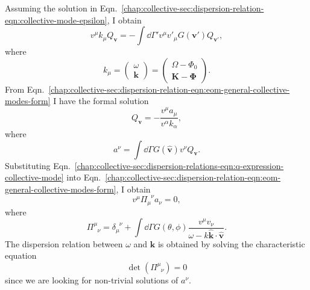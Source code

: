 Assuming the solution in Eqn.~\eqref{chap:collective-sec:dispersion-relation-eqn:collective-mode-epsilon}, I obtain
\begin{equation}
    v^\mu k_\mu Q_{\mathbf v}   =  - \int \dd \Gamma' v^\mu v'_\mu G(\mathbf v')  Q_{\mathbf v'},
    \label{chap:collective-sec:dispersion-relation-eqn:eom-general-collective-modes-form}
\end{equation}
where
\begin{equation}
    k_\mu = \begin{pmatrix}
        \omega \\
        \mathbf k
    \end{pmatrix} = \begin{pmatrix}
        \Omega - \Phi_0 \\
        \mathbf K - \boldsymbol{\Phi}
    \end{pmatrix}.
\end{equation}
From Eqn.~\eqref{chap:collective-sec:dispersion-relation-eqn:eom-general-collective-modes-form} I have the formal solution
\begin{equation}
    Q_{\mathbf v} = - \frac{ v^\mu a_\mu }{ v^\alpha k_\alpha},
    \label{chap:collective-sec:dispersion-relations-eqn:q-expression-collective-mode}
\end{equation}
where
\begin{equation}
    a^\nu = \int \dd \Gamma G(\hat{\mathbf v}) v^\nu Q_{\mathbf v}.
\end{equation}
Substituting Eqn.~\eqref{chap:collective-sec:dispersion-relations-eqn:q-expression-collective-mode} into Eqn.~\eqref{chap:collective-sec:dispersion-relation-eqn:eom-general-collective-modes-form}, I obtain
\begin{equation}
 v^\mu \Pi_{\mu}^{\phantom{\mu}\nu} a_\nu  = 0,
\end{equation}
where
\begin{equation}
\Pi^\mu_{\phantom{\mu}\nu} = \delta_\mu^{\phantom{\mu}\nu} + \int \dd \Gamma G(\theta,\phi) \frac{v^\mu v_\nu}{\omega- k \hat{\mathbf k}\cdot \hat{\mathbf v} }.
\end{equation}
The dispersion relation between $\omega$ and $\mathbf k$ is obtained by solving the characteristic equation~\cite{Izaguirre2016a}
\begin{equation}
\operatorname{det}\left( \Pi^\mu_{\phantom{\mu}\nu} \right) = 0
\label{eqn-dr-determinant-equation}
\end{equation}
since we are looking for non-trivial solutions of $a^\nu$.





